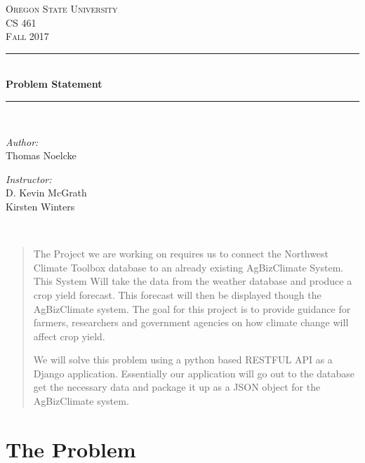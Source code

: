 \documentclass[letterpaper,10pt]{article}
\begin{document}
    \begin{titlepage}
    \newcommand{\HRule}{\rule{\linewidth}{0.5mm}}
    \center
    \textsc{\Large Oregon State University}\\[1.5cm]
    \textsc{\Large CS 461}\\[0.5cm]
    \textsc{\Large Fall 2017}\\[0.5cm]
    \HRule \\[0.4cm]
    { \huge \bfseries Problem Statement}\\[0.4cm] %
    \HRule \\[1.5cm]
    \begin{minipage}{0.4\textwidth}
        \begin{flushleft} \large
        \emph{Author:}\\
        Thomas Noelcke
        \end{flushleft}
    \end{minipage}
    \begin{minipage}{0.4\textwidth}
        \begin{flushright} \large
        \emph{Instructor:} \\
        D. Kevin McGrath\\
        Kirsten Winters
        \end{flushright}
    \end{minipage}\\[2cm]
    \begin{abstract}
    \item 
			The Project we are working on requires us to connect the Northwest Climate Toolbox database to an already existing AgBizClimate System. This System Will take the data from the weather database and produce a crop yield forecast. This forecast will then be displayed though the AgBizClimate system. The goal for this project is to provide guidance for farmers, researchers and government agencies on how climate change will affect crop yield.
			
			We will solve this problem using a python based RESTFUL API as a Django application. Essentially our application will go out to the database get the necessary data and package it up as a JSON object for the AgBizClimate system.
			

    \end{abstract}
    \vfill %
    \end{titlepage}
		
\section{The Problem}
\end{document}
